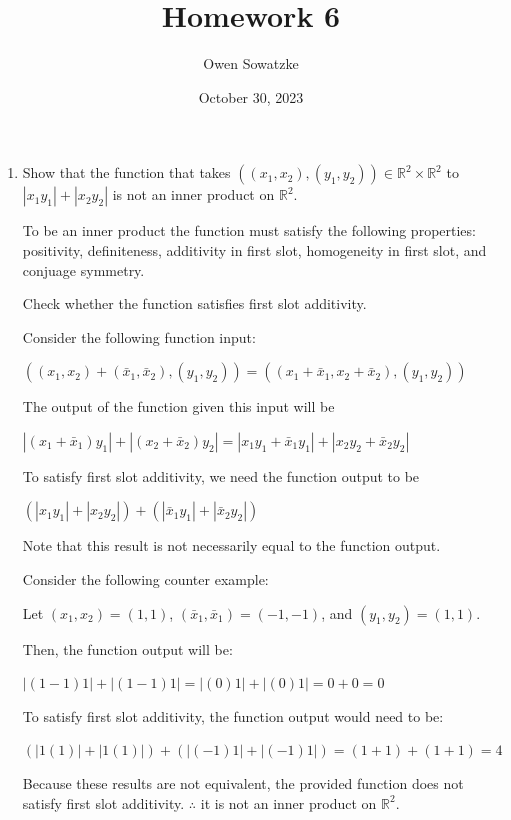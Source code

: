 \documentclass[fleqn]{article}
\title{Homework 6}
\author{Owen Sowatzke}
\date{October 30, 2023}
\newcommand{\zerodisplayskip}{
	\setlength{\abovedisplayskip}{0pt}%
	\setlength{\belowdisplayskip}{0pt}%
	\setlength{\abovedisplayshortskip}{0pt}%
	\setlength{\belowdisplayshortskip}{0pt}%
	\setlength{\mathindent}{0pt}}
\begin{document}
	\offinterlineskip
	\setlength{\lineskip}{12pt}
	\zerodisplayskip
	\maketitle
	
	\begin{enumerate}[nolistsep]
		\item Show that the function that takes $((x_1, x_2),(y_1,y_2)) \in \mathbb{R}^2 \times \mathbb{R}^2$ to \newline $|x_1y_1| + |x_2y_2|$ is not an inner product on $\mathbb{R}^2$.
		
			To be an inner product the function must satisfy the following properties: positivity, definiteness, additivity in first slot, homogeneity in first slot, and conjuage symmetry.
			
			Check whether the function satisfies first slot additivity.
			
			Consider the following function input:
			
			$((x_1, x_2) + (\bar{x}_1, \bar{x}_2),(y_1,y_2)) = ((x_1 + \bar{x}_1, x_2 + \bar{x}_2),(y_1,y_2))$
			
			The output of the function given this input will be
			
			$|(x_1 + \bar{x}_1)y_1| + |(x_2 + \bar{x}_2)y_2| = |x_1y_1 + \bar{x}_1y_1| + |x_2y_2 + \bar{x}_2y_2|$
			
			To satisfy first slot additivity, we need the function output to be
			
			$(|x_1y_1| + |x_2y_2|) + (|\bar{x}_1y_1| + |\bar{x}_2y_2|)$
			
			Note that this result is not necessarily equal to the function output.
			
			Consider the following counter example:
			
			Let $(x_1,x_2) = (1,1)$, $(\bar{x}_1,\bar{x}_1) = (-1,-1)$, and $(y_1,y_2) = (1,1)$.
			
			Then, the function output will be:
			
			$|(1 - 1)1| + |(1 - 1)1| = |(0)1| + |(0)1| = 0 + 0 = 0$
			
			To satisfy first slot additivity, the function output would need to be:
			
			$(|1(1)| + |1(1)|) + (|(-1)1| + |(-1)1|) = (1 + 1) + (1 + 1) = 4$
			
			Because these results are not equivalent, the provided function does not satisfy first slot additivity. $\therefore$ it is not an inner product on $\mathbb{R}^2$.
			

\end{enumerate}
\end{document}
